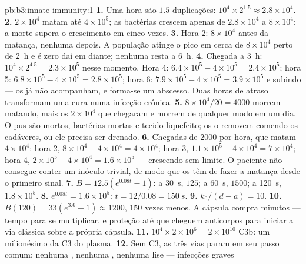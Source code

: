 \begin{solution}{pb:b3:innate-immunity:1}
\textbf{1.} Uma hora são $1.5$ duplicações: $10^{4}\times 2^{1.5} \approx
2.8\times 10^{4}$.
\textbf{2.} $2\times 10^{4}$  matam até $4\times 10^{5}$;
as bactérias crescem apenas de $2.8\times 10^{4}$ a $8\times 10^{4}$:
a morte supera o crescimento em cinco vezes.
\textbf{3.} Hora 2: $8\times 10^{4}$ antes da matança, nenhuma depois. A
população atinge o pico em cerca de $8\times 10^{4}$ perto de
\qty{2}{h} e é zero daí em diante; nenhuma resta a \qty{6}{h}.
\textbf{4.} Chegada a \qty{3}{h}: $10^{4}\times 2^{4.5} = 2.3\times
10^{5}$ nesse momento. Hora 4: $6.4\times 10^{5} - 4\times 10^{5} = 2.4\times
10^{5}$; hora 5: $6.8\times 10^{5} - 4\times 10^{5} = 2.8\times 10^{5}$; hora 6: $7.9\times 10^{5} - 4\times 10^{5} = 3.9\times 10^{5}$ e subindo --- os  já não acompanham, e
forma-se um abscesso. Duas horas de atraso transformam uma cura numa
infecção crônica.
\textbf{5.} $8\times 10^{4}/20 = 4000$  morrem matando, mais
os $2\times 10^{4}$ que chegaram e morrem de qualquer modo em um dia. O
pus são  mortos, bactérias mortas e tecido liquefeito; os
 o removem comendo os cadáveres, ou ele precisa ser drenado.
\textbf{6.} Chegadas de $2000$ por hora, que matam $4\times 10^{4}$:
hora 2, $8\times 10^{4} - 4\times 10^{4} = 4\times 10^{4}$; hora 3,
$1.1\times
10^{5} - 4\times 10^{4} = 7\times 10^{4}$; hora 4, $2\times 10^{5} -
4\times 10^{4} = 1.6\times 10^{5}$ --- crescendo sem limite. O
paciente não consegue conter um inóculo trivial, de modo que os
 têm de fazer a matança desde o primeiro sinal.
\textbf{7.} $B = 12.5(e^{0.08t} - 1)$: a \qty{30}{s}, $125$; a
\qty{60}{s}, $1500$; a \qty{120}{s}, $1.8\times 10^{5}$.
\textbf{8.} $e^{0.08t} = 1.6\times 10^{5}$: $t = 12/0.08 = \qty{150}{s}$.
\textbf{9.} $k_{0}/(d - a) = 10$.
\textbf{10.} $B(120) = 33(e^{3.6} - 1) \approx 1200$, $150$ vezes menos.
A cápsula compra minutos --- tempo para se multiplicar, e proteção até
que cheguem anticorpos para iniciar a via clássica sobre a própria
cápsula.
\textbf{11.} $10^{4}\times 2\times 10^{6} = 2\times 10^{10}$ C3b: um
milionésimo da C3 do plasma.
\textbf{12.} Sem C3, as três vias param em seu passo comum: nenhuma
, nenhuma , nenhuma lise --- infecções graves

\end{solution}
